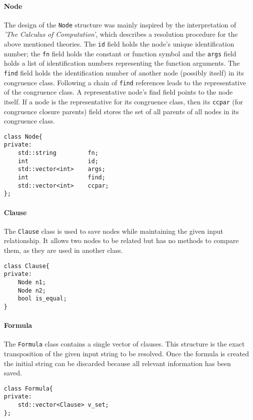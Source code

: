\documentclass{IEEEtran}
\begin{document}
\paragraph{Node} 
The design of the \verb|Node| structure was mainly inspired by the interpretation of  \textit{'The Calculus of Computation'}\cite{10.5555/1324777}, which describes a resolution procedure for the above mentioned theories. The \verb|id| field holds the node’s unique identification number; the \verb|fn| field holds the constant or function symbol and the \verb|args| field holds a list of identification numbers representing the function arguments. The \verb|find| field holds the identification number of another node (possibly itself) in its congruence class. Following a chain of \verb|find| references leads to the representative of the congruence class. A representative node’s find field points to the node itself. If a node is the representative for its congruence class, then its \verb|ccpar| (for congruence closure parents) field stores the set of all parents of all nodes in its congruence class.
\begin{lstlisting}[style=cpp]
class Node{
private:
	std::string 		fn;                  
	int			 		id;                
	std::vector<int> 	args; 
	int			 		find;              
	std::vector<int>	ccpar;
};
\end{lstlisting}

\paragraph{Clause} 
The \verb|Clause| class is used to save nodes while maintaining the given input relationship. It allows two nodes to be related but has no methods to compare them, as they are used in another class.
\begin{lstlisting}[style=cpp]
class Clause{
private:
	Node n1;
	Node n2;
	bool is_equal;
}
\end{lstlisting}

\paragraph{Formula}
The \verb|Formula| class contains a single vector of clauses. This structure is the exact transposition of the given input string to be resolved. Once the formula is created the initial string can be discarded because all relevant information has been saved.
\begin{lstlisting}[style=cpp]
class Formula{
private:
	std::vector<Clause> v_set;
};
\end{lstlisting}
\end{document}
